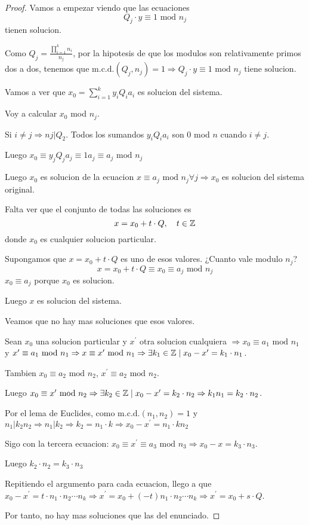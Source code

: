 \begin{proof}
	Vamos a empezar viendo que las ecuaciones
	\[
		Q_j \cdot y \equiv 1 \text{ mod } n_j
	\]
	tienen solucion.
	
	Como \(Q_j = \frac{\prod\limits_{i =1}^{k } n_i}{n_j} \), por la hipotesis de que los modulos son relativamente primos dos a dos, tenemos que \(\mathrm{m.c.d.}(Q_j,n_j ) = 1 \Rightarrow Q_j \cdot y \equiv 1 \text{ mod } n_j \text{ tiene solucion}  \).
	
	Vamos a ver que \(x_0 = \sum_{i=1}^{k } y_i Q_i a_i \) es solucion del sistema.
	
	Voy a calcular \(x_0 \) mod \(n_j \).
	
	Si \(i \neq j \Rightarrow nj |Q_2 \). Todos los sumandos \(y_i Q_i a_i \) son 0 mod \( n \) cuando \(i \neq j \).
	
	Luego \(x_0 \equiv y_j Q_j a_j \equiv 1 a_j \equiv a_j \text{ mod } n_j  \)
	
	Luego \(x_0 \) es solucion de la ecuacion \(x \equiv a_j \text{ mod } n_j \forall j \Rightarrow x_{0}\) es solucion del sistema original.
	
	Falta ver que el conjunto de todas las soluciones es
	\[
		x = x_0 + t \cdot Q, \quad t \in \mathbb{Z}
	\]
	donde \(x_0 \) es cualquier solucion particular.
	
	Supongamos que \(x = x_0 + t \cdot Q \) es uno de esos valores.
	¿Cuanto vale modulo \(n_j\)?
	\[
		x = x_0 + t \cdot Q \equiv x_0 \equiv a_j \text{ mod } n_j
	\]
	\(x_0 \equiv a_j \) porque \(x_0 \) es solucion.
	
	Luego \(x \) es solucion del sistema.
	
	\vspace{0.1cm}
	Veamos que no hay mas soluciones que esos valores.
	
	Sean \(x_0 \) una solucion particular y \(x^\prime  \) otra solucion cualquiera \(\Rightarrow x_0 \equiv a_1 \text{ mod }n_1  \) y \(x^\prime  \equiv a_1 \text{ mod } n_1 \Rightarrow x \equiv x^\prime \text{ mod } n_1 \Rightarrow \exists k_1 \in \mathbb{Z} \mid  x_0 - x^\prime = k_1 \cdot n_1 \).
	
	Tambien \(x_0 \equiv a_2 \text{ mod } n_2 \), \(x^\prime  \equiv a_2 \text{ mod } n_2 \).
	
	Luego \(x_0 \equiv x^\prime \text{ mod }n_2 \Rightarrow \exists k_2 \in \mathbb{Z} \mid x_0 - x^\prime = k_2 \cdot n_2 \Rightarrow k_1 n_1 = k_2 \cdot n_2\).
	
	Por el lema de Euclides, como \(\mathrm{m.c.d.}(n_1,n_2) = 1  \) y \(n_1 | k_2 n_2 \Rightarrow n_1 | k_2 \Rightarrow k_2 = n_1 \cdot k \Rightarrow x_0 - x^\prime = n_1 \cdot k n_2 \)
	
	Sigo con la tercera ecuacion: \(x_0 \equiv x^\prime \equiv a_3 \text{ mod } n_3 \Rightarrow x_0 - x = k_3 \cdot n_3\).
	
	Luego \(k_2 \cdot n_2 = k_3 \cdot n_3 \)
	
	Repitiendo el argumento para cada ecuacion, llego a que \(x_0 - x^\prime = t \cdot n_1 \cdot n_2 \cdots n_k \Rightarrow x^\prime  = x_0 + (-t) n_1 \cdot n_2 \cdots n_k \Rightarrow x^\prime = x_0 + s \cdot Q 	\).
	
	Por tanto, no hay mas soluciones que las del enunciado.
\end{proof}

